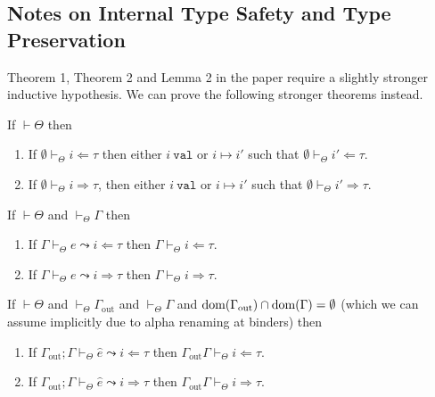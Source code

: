 \subsection{Notes on Internal Type Safety and Type Preservation}
Theorem 1, Theorem 2 and Lemma 2 in the paper require a slightly stronger inductive hypothesis. We can prove the following stronger theorems instead.
\newcommand{\ih}{\hat{e}}
\begin{theorem}
If $\vdash \Theta$ then
\begin{enumerate}
\item If $\emptyset \vdash_\Theta i \Leftarrow \tau$ then either $i~\mathtt{val}$ or $i \mapsto i'$ such that $\emptyset \vdash_\Theta i' \Leftarrow \tau$.
\item If $\emptyset \vdash_\Theta i \Rightarrow \tau$, then either $i~\mathtt{val}$ or $i \mapsto i'$ such that $\emptyset \vdash_\Theta i' \Rightarrow \tau$.
\end{enumerate}
\end{theorem}

\begin{theorem}
If $\vdash \Theta$ and $\vdash_\Theta \Gamma$ then
\begin{enumerate}
\item If $\Gamma \vdash_\Theta e \leadsto i \Leftarrow \tau$ then $\Gamma \vdash_\Theta i \Leftarrow \tau$.
\item If $\Gamma \vdash_\Theta e \leadsto i \Rightarrow \tau$ then $\Gamma \vdash_\Theta i \Rightarrow \tau$.
\end{enumerate}
\end{theorem}

\begin{lemma}
If $\vdash \Theta$ and $\vdash_\Theta \Gamma_{\text{out}}$ and $\vdash_\Theta \Gamma$ and $\text{dom}(\Gamma_{\text{out}}) \cap \text{dom}(\Gamma) = \emptyset$ (which we can assume implicitly due to alpha renaming at binders) then
\begin{enumerate}
\item If $\Gamma_{\text{out}}; \Gamma \vdash_\Theta \ih \leadsto i \Leftarrow \tau$ then $\Gamma_{\text{out}} \Gamma \vdash_\Theta i \Leftarrow \tau$.
\item If $\Gamma_{\text{out}}; \Gamma \vdash_\Theta \ih \leadsto i \Rightarrow \tau$ then $\Gamma_{\text{out}} \Gamma \vdash_\Theta i \Rightarrow \tau$.
\end{enumerate}
\end{lemma}
\newpage
